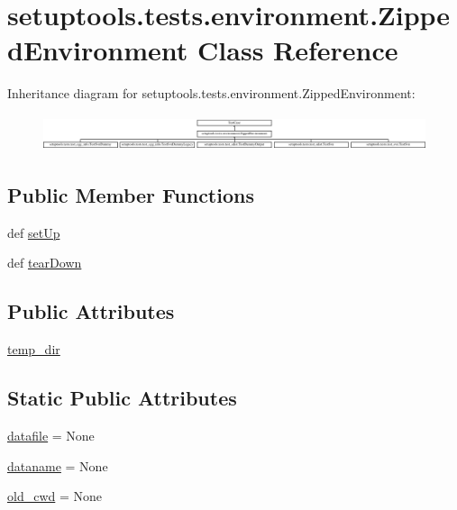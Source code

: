 \hypertarget{classsetuptools_1_1tests_1_1environment_1_1ZippedEnvironment}{}\section{setuptools.\+tests.\+environment.\+Zipped\+Environment Class Reference}
\label{classsetuptools_1_1tests_1_1environment_1_1ZippedEnvironment}
Inheritance diagram for setuptools.\+tests.\+environment.\+Zipped\+Environment\+:\begin{figure}[H]
\begin{center}
\leavevmode
\includegraphics[height=1.063291cm]{classsetuptools_1_1tests_1_1environment_1_1ZippedEnvironment}
\end{center}
\end{figure}
\subsection*{Public Member Functions}
\begin{DoxyCompactItemize}
\item 
def \hyperlink{classsetuptools_1_1tests_1_1environment_1_1ZippedEnvironment_a8d8f8531176136bbae1bfddd9c1a857d}{set\+Up}
\item 
def \hyperlink{classsetuptools_1_1tests_1_1environment_1_1ZippedEnvironment_a9f07fbe39f929d8c0b269330ef416536}{tear\+Down}
\end{DoxyCompactItemize}
\subsection*{Public Attributes}
\begin{DoxyCompactItemize}
\item 
\hyperlink{classsetuptools_1_1tests_1_1environment_1_1ZippedEnvironment_ad6e411779c720348b87560aa1121c238}{temp\+\_\+dir}
\end{DoxyCompactItemize}
\subsection*{Static Public Attributes}
\begin{DoxyCompactItemize}
\item 
\hyperlink{classsetuptools_1_1tests_1_1environment_1_1ZippedEnvironment_ac3de769ff5dbb5f0c037bdbdc73bf9ff}{datafile} = None
\item 
\hyperlink{classsetuptools_1_1tests_1_1environment_1_1ZippedEnvironment_ab4b25a142402e02961f690653c574951}{dataname} = None
\item 
\hyperlink{classsetuptools_1_1tests_1_1environment_1_1ZippedEnvironment_a88544cf5aca953fd6f81b5a183a4d67a}{old\+\_\+cwd} = None
\end{DoxyCompactItemize}


